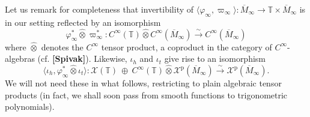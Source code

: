 \documentclass{article}
\def\TT{\mathbb{T}}
\def\XX{\mathcal{X}}
\def\p{\mathrm{p}}
\theoremstyle{definition}
\begin{document}
Let us remark for completeness that 
invertibility of $\langle \varphi_\infty, \varpi_\infty\rangle : \overline M_\infty
\to \TT \times \overline M_\infty$ is in our setting reflected by
an isomorphism
$$
\varphi_\infty^* \widehat\otimes \varpi_\infty^* : C^\infty(\TT) \widehat{\otimes}
C^\infty(\overline M_\infty) \xrightarrow{\sim} C^\infty(\overline M_\infty)
$$
where $\widehat\otimes$ denotes the $C^\infty$ tensor product, a coproduct
in the category of $C^\infty$-algebras (cf. \textbf{[Spivak]}).
Likewise, $\iota_h$ and $\iota_t$ give rise to an isomorphism
$$
\langle \iota_h, \varphi_\infty^* \widehat\otimes \iota_t \rangle : \XX(\TT)\ \oplus\ C^\infty(\TT)
\widehat\otimes \XX^\p(\overline M_\infty) \xrightarrow{\sim} \XX^\p(\overline M_\infty).  
$$
We will not need these in what follows, restricting to plain algebraic tensor products
(in fact, we shall soon pass from smooth functions to trigonometric polynomials).
\end{document}
